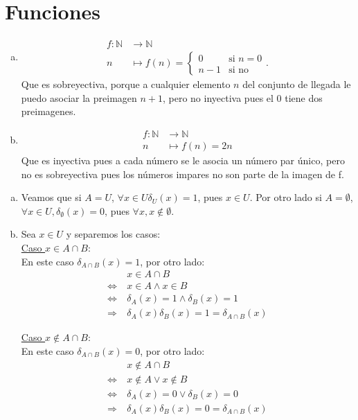 \documentclass[dcc]{fcfmcourse}
\begin{document}
\section*{Funciones}
\begin{problems}
\problem 
\begin{enumerate}[a)]
\item 
\begin{align*}
      f \colon \mathbb{N} &\to \mathbb{N}\\
      n &\mapsto f(n) =  \left\{\begin{array}{lr}
            0 & \text{si } n=0\\
            n-1 & \text{si no}
            \end{array}
       \right..
\end{align*}
Que es sobreyectiva, porque a cualquier elemento $n$ del conjunto de llegada le puedo asociar la preimagen $n+1$, pero no inyectiva pues el $0$ tiene dos preimagenes.

\item
\begin{align*}
      f \colon \mathbb{N} &\to \mathbb{N}\\
      n &\mapsto f(n) =  2n
\end{align*}
Que es inyectiva pues a cada número se le asocia un número par único, pero no es sobreyectiva pues los números impares no son parte de la imagen de f.
\end{enumerate}
\problem 
\begin{enumerate}[a)]
\item Veamos que si  $A=U$, $\forall x\in U \delta_{U}(x) = 1$, pues $x \in U$. Por otro lado si $A=\emptyset$, $\forall x \in U, \delta_{\emptyset}(x) = 0$, pues $\forall x, x \not\in \emptyset$.
\item Sea $x \in U$ y separemos los casos:\\

\underline{Caso $x \in A\cap B$}:\\
En este caso $\delta_{A \cap B}(x) = 1$, por otro lado:
\begin{align*}
& x\in A\cap B\\
\Leftrightarrow\ & x\in A \land x \in B\\
\Leftrightarrow\ & \delta_{A}(x) = 1 \land \delta_{B}(x) = 1\\
\Rightarrow\ & \delta_{A}(x)\delta_{B}(x) = 1 = \delta_{A \cap B}(x)
\end{align*}

\underline{Caso $x \not\in A\cap B$}:\\
En este caso $\delta_{A \cap B}(x) = 0$, por otro lado:
\begin{align*}
& x\not\in A\cap B\\
\Leftrightarrow\ & x\not\in A \lor x \not\in B\\
\Leftrightarrow\ & \delta_{A}(x) = 0 \lor \delta_{B}(x) = 0\\
\Rightarrow\ & \delta_{A}(x)\delta_{B}(x) = 0 = \delta_{A \cap B}(x)
\end{align*}


\end{enumerate}
\end{problems}
\end{document}
